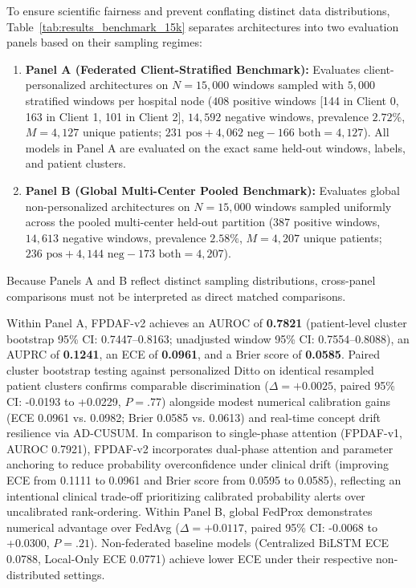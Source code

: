 \documentclass[10pt,a4paper,twocolumn,twoside]{article}
\begin{document}
To ensure scientific fairness and prevent conflating distinct data distributions, Table~\ref{tab:results_benchmark_15k} separates architectures into two evaluation panels based on their sampling regimes:
\begin{enumerate}
    \item \textbf{Panel A (Federated Client-Stratified Benchmark):} Evaluates client-personalized architectures on $N=15,000$ windows sampled with $5,000$ stratified windows per hospital node ($408$ positive windows [144 in Client 0, 163 in Client 1, 101 in Client 2], $14,592$ negative windows, prevalence $2.72\%$, $M=4,127$ unique patients; $231 \text{ pos} + 4,062 \text{ neg} - 166 \text{ both} = 4,127$). All models in Panel A are evaluated on the exact same held-out windows, labels, and patient clusters.
    \item \textbf{Panel B (Global Multi-Center Pooled Benchmark):} Evaluates global non-personalized architectures on $N=15,000$ windows sampled uniformly across the pooled multi-center held-out partition ($387$ positive windows, $14,613$ negative windows, prevalence $2.58\%$, $M=4,207$ unique patients; $236 \text{ pos} + 4,144 \text{ neg} - 173 \text{ both} = 4,207$).
\end{enumerate}
Because Panels A and B reflect distinct sampling distributions, cross-panel comparisons must not be interpreted as direct matched comparisons.

Within Panel A, FPDAF-v2 achieves an AUROC of \textbf{0.7821} (patient-level cluster bootstrap 95\% CI: 0.7447--0.8163; unadjusted window 95\% CI: 0.7554--0.8088), an AUPRC of \textbf{0.1241}, an ECE of \textbf{0.0961}, and a Brier score of \textbf{0.0585}. Paired cluster bootstrap testing against personalized Ditto on identical resampled patient clusters confirms comparable discrimination ($\Delta = +0.0025$, paired 95\% CI: -0.0193 to +0.0229, $P = .77$) alongside modest numerical calibration gains (ECE 0.0961 vs. 0.0982; Brier 0.0585 vs. 0.0613) and real-time concept drift resilience via AD-CUSUM. In comparison to single-phase attention (FPDAF-v1, AUROC 0.7921), FPDAF-v2 incorporates dual-phase attention and parameter anchoring to reduce probability overconfidence under clinical drift (improving ECE from 0.1111 to 0.0961 and Brier score from 0.0595 to 0.0585), reflecting an intentional clinical trade-off prioritizing calibrated probability alerts over uncalibrated rank-ordering. Within Panel B, global FedProx demonstrates numerical advantage over FedAvg ($\Delta = +0.0117$, paired 95\% CI: -0.0068 to +0.0300, $P = .21$). Non-federated baseline models (Centralized BiLSTM ECE 0.0788, Local-Only ECE 0.0771) achieve lower ECE under their respective non-distributed settings.
\end{document}
